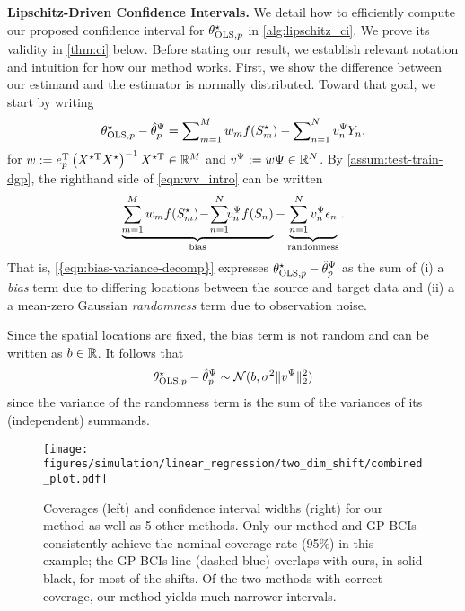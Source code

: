 \textbf{Lipschitz-Driven Confidence Intervals.} We detail how to efficiently compute our proposed confidence interval for $\theta^{\star}_{\text{OLS},p}$ in \cref{alg:lipschitz_ci}. We prove its validity in \cref{thm:ci} below. Before stating our result, we establish relevant notation and intuition for how our method works.
%
First, we show the difference between our estimand and the estimator is normally distributed. Toward that goal, we start by writing
\begin{align}
    \label{eqn:wv_intro}
   \theta^{\star}_{\text{OLS},p} - \hat{\theta}_p^{\Psi}
    =
    \sum\nolimits_{m=1}^M w_m f(S^{\star}_m) - \sum\nolimits_{n=1}^N v^{\Psi}_nY_n,
\end{align}
for $w:= e_p^{\mathrm{T}}\left(X^{\star\mathrm{T}}X^{\star} \right)^{-1}X^{\star\mathrm{T}} \in \mathbb{R}^{M}$ and $v^{\Psi} := w\Psi  \in \mathbb{R}^{N}$. By \cref{assum:test-train-dgp}, the righthand side of \cref{eqn:wv_intro} can be written 
\begin{align}\label{eqn:bias-variance-decomp}
\underbrace{\sum_{m=1}^M w_m f(S^{\star}_m) \!-\!\sum_{n=1}^N \!\!v^{\Psi}_n f(S_n)}_{\text{bias}} - \underbrace{\sum_{n=1}^N v^{\Psi}_n\epsilon_n}_{\text{randomness}}.
\end{align}
%
That is, \cref{{eqn:bias-variance-decomp}} expresses $\theta^{\star}_{\text{OLS},p} - \hat{\theta}_p^{\Psi}$ as the sum of (i) a \textit{bias} term due to differing locations between the source and target data and (ii) a a mean-zero Gaussian \textit{randomness} term due to observation noise.

Since the spatial locations are fixed, the bias term is not random and can be written as $b \in \mathbb{R}$. It follows that
\begin{align}\label{eqn:diff-gaussian}
    \theta^{\star}_{\text{OLS},p}  -  \hat{\theta}_p^{\Psi} \sim \mathcal{N}(b, \sigma^2\|v^{\Psi}\|_2^2)
\end{align}
since the variance of the randomness term is the sum of the variances of its (independent) summands.
\begin{figure*}[!ht]
    \centering
    \texttt{[image: figures/simulation/linear\_regression/two\_dim\_shift/combined\_plot.pdf]}
    \caption{Coverages (left) and confidence interval widths (right) for our method as well as 5 other methods. Only our method and GP BCIs consistently achieve the nominal coverage rate (95\%) in this example; the GP BCIs line (dashed blue) overlaps with ours, in solid black, for most of the shifts. Of the two methods with correct coverage, our method yields much narrower intervals.}
    \label{fig:combined-plot-simulation}
\end{figure*}

